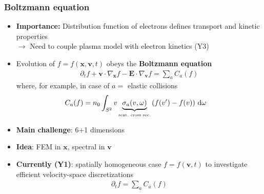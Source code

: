 \documentclass[mathserif, aspectratio=169]{beamer}
\newcommand{\ud}{\,\mathrm{d}}
\newcommand{\vect}[1]{\boldsymbol{#1}}
\begin{document}
\begin{frame}
\frametitle{Boltzmann equation}
%
\begin{itemize}
\item \textbf{Importance:} 
Distribution function of electrons defines transport and kinetic properties
\\
$\rightarrow$ Need to couple plasma model with electron kinetics (Y3)
\item Evolution of $f = f(\vect{x}, \vect{v}, t)$ obeys the \textbf{Boltzmann equation}
\small
\begin{align*}
\partial_t f + \vect{v}\cdot \nabla_{\vect{x}} f  - \vect{E} \cdot \nabla_{\vect{v }}f = \sum_{a} C_a(f)
\end{align*}
where, for example, in case of $a=$ elastic collisions
\begin{align*}
C_a(f) &= n_0\int_{S^2} v \underbrace{\sigma_a(v,\omega)}_{\tiny\text{\tiny scat. cross sec.}} 
\left( f(v^\prime) - f(v) \right) \ud \omega 
\end{align*}
\item \textbf{Main challenge}: 6+1 dimensions
\item \textbf{Idea}: FEM in $\vect{x}$, spectral in $\vect{v}$
\item \textbf{Currently (Y1)}: spatially homogeneous case $f = f(\vect{v}, t)$ to investigate efficient velocity-space discretizations
\begin{align*}
\partial_t f = \sum_{a} C_a(f)
\end{align*}
\end{itemize}
%
\end{frame}
%
\end{document}
